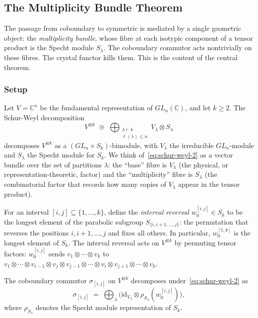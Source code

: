 \subsection{The Multiplicity Bundle Theorem}
\label{sec:hierarchy-multiplicity}

The passage from coboundary to symmetric is mediated by a single
geometric object: the \emph{multiplicity bundle}, whose fibre at each
isotypic component of a tensor product is the Specht module $S_\lambda$.
The coboundary commutor acts nontrivially on these fibres.  The crystal
functor kills them.  This is the content of the central theorem.

\subsubsection*{Setup}

Let $V = \mathbb{C}^n$ be the fundamental representation of
$GL_n(\mathbb{C})$, and let $k \geq 2$.  The Schur-Weyl decomposition
\begin{equation}
\label{eq:schur-weyl-2}
  V^{\otimes k} \;\cong\;
  \bigoplus_{\substack{\lambda \vdash k \\ \ell(\lambda) \leq n}}
  V_\lambda \otimes S_\lambda
\end{equation}
decomposes $V^{\otimes k}$ as a $(GL_n \times S_k)$-bimodule, with
$V_\lambda$ the irreducible $GL_n$-module and $S_\lambda$ the Specht
module for $S_k$.  We think of~\eqref{eq:schur-weyl-2} as a vector
bundle over the set of partitions $\lambda$: the ``base'' fibre is
$V_\lambda$ (the physical, or representation-theoretic, factor) and
the ``multiplicity'' fibre is $S_\lambda$ (the combinatorial factor
that records how many copies of $V_\lambda$ appear in the tensor
product).

For an interval $[i,j] \subseteq \{1, \ldots, k\}$, define the
\emph{interval reversal} $w_0^{[i,j]} \in S_k$ to be the longest
element of the parabolic subgroup $S_{\{i, i+1, \ldots, j\}}$: the
permutation that reverses the positions $i, i+1, \ldots, j$ and fixes
all others.  In particular, $w_0^{[1,k]}$ is the longest element of
$S_k$.  The interval reversal acts on $V^{\otimes k}$ by permuting
tensor factors: $w_0^{[i,j]}$ sends
$v_1 \otimes \cdots \otimes v_k$ to
$v_1 \otimes \cdots \otimes v_{i-1} \otimes v_j \otimes v_{j-1}
\otimes \cdots \otimes v_i \otimes v_{j+1} \otimes \cdots \otimes v_k$.

\begin{theorem}
\label{thm:multiplicity-bundle}
The coboundary commutor $\sigma_{[i,j]}$ on $V^{\otimes k}$
decomposes under~\eqref{eq:schur-weyl-2} as
\begin{equation}
\label{eq:mult-bundle}
  \sigma_{[i,j]} \;=\;
  \bigoplus_\lambda \bigl(\mathrm{id}_{V_\lambda} \otimes
  \rho_{S_\lambda}(w_0^{[i,j]})\bigr),
\end{equation}
where $\rho_{S_\lambda}$ denotes the Specht module representation of
$S_k$.
\end{theorem}

